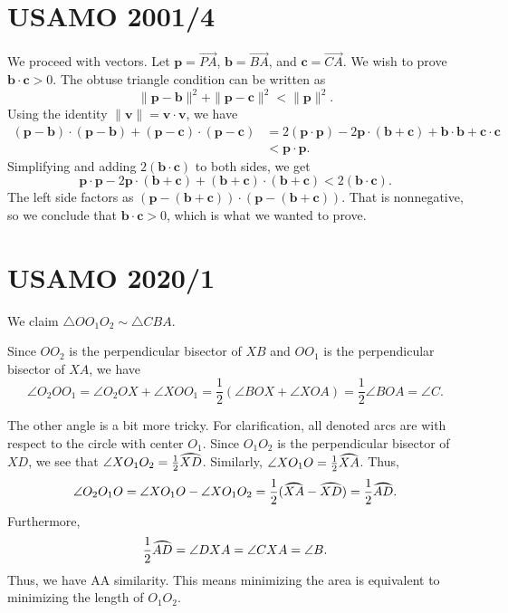 \documentclass{scrartcl}
\begin{document}
\section*{USAMO 2001/4}
We proceed with vectors. Let $\mathbf{p} = \overrightarrow{PA}$, $\mathbf{b} = \overrightarrow{BA}$, and $\mathbf{c} = \overrightarrow{CA}$. We wish to prove $\mathbf{b} \cdot \mathbf{c} > 0$.
The obtuse triangle condition can be written as
\[ \| \mathbf{p} - \mathbf{b} \|^2 + \| \mathbf{p} - \mathbf{c} \|^2 < \| \mathbf{p} \| ^2. \]
Using the identity $\| \mathbf{v} \| = \mathbf{v} \cdot \mathbf{v}$, we have
\begin{align*}
(\mathbf{p} - \mathbf{b}) \cdot (\mathbf{p} - \mathbf{b}) + (\mathbf{p} - \mathbf{c}) \cdot (\mathbf{p} - \mathbf{c}) &= 2(\mathbf{p} \cdot \mathbf{p}) - 2\mathbf{p} \cdot (\mathbf{b} + \mathbf{c}) + \mathbf{b} \cdot \mathbf{b} + \mathbf{c} \cdot \mathbf{c} \\
&< \mathbf{p} \cdot \mathbf{p}.
\end{align*}
Simplifying and adding $2(\mathbf{b} \cdot \mathbf{c})$ to both sides, we get
\[ \mathbf{p} \cdot \mathbf{p} - 2\mathbf{p} \cdot (\mathbf{b} + \mathbf{c}) + (\mathbf{b} + \mathbf{c}) \cdot (\mathbf{b} + \mathbf{c}) < 2(\mathbf{b} \cdot \mathbf{c}). \]
The left side factors as $(\mathbf{p} - (\mathbf{b} + \mathbf{c})) \cdot (\mathbf{p} - (\mathbf{b} + \mathbf{c}))$. That
is nonnegative, so we conclude that $\mathbf{b} \cdot \mathbf{c} > 0$, which is what we wanted to prove.

\section*{USAMO 2020/1}
We claim $\triangle OO_1O_2 \sim \triangle CBA$.

Since $OO_2$ is the perpendicular bisector of $XB$ and $OO_1$ is the perpendicular bisector of $XA$, we have
\[ \angle O_2OO_1 = \angle O_2OX + \angle XOO_1 = \frac12 (\angle BOX + \angle XOA) = \frac12 \angle BOA = \angle C. \]

The other angle is a bit more tricky. For clarification, all denoted arcs are with respect to the circle with center $O_1$. Since $O_1O_2$ is the perpendicular bisector of $XD$, we see that $\angle XO_1O_2 = \frac12 \arc{XD}$. Similarly, $\angle XO_1O = \frac12 \arc{XA}$. Thus,
\[ \angle O_2O_1O = \angle XO_1O - \angle XO_1O_2 = \frac12 (\arc{XA} - \arc{XD}) = \frac12 \arc{AD}. \]
Furthermore,
\[ \frac12 \arc{AD} = \angle DXA = \angle CXA = \angle B. \]
Thus, we have AA similarity. This means minimizing the area is equivalent to minimizing the length of $O_1O_2$.
\end{document}
